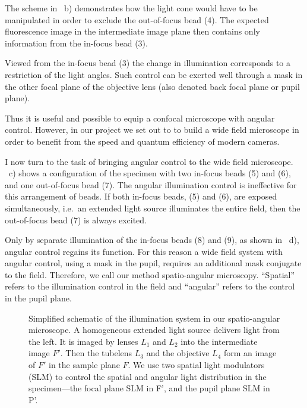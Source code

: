 The scheme in ~b) demonstrates how the light
cone would have to be manipulated in order to exclude the out-of-focus
bead (4). The expected fluorescence image in the intermediate image
plane then contains only information from the in-focus bead (3).

Viewed from the in-focus bead (3) the change in illumination
corresponds to a restriction of the light angles. Such control can be
exerted well through a mask in the other focal plane of the objective
lens (also denoted back focal plane or pupil plane).

Thus it is useful and possible to equip a confocal microscope with
angular control. However, in our project we set out to to build a wide
field microscope in order to benefit from the speed and quantum
efficiency of modern cameras.

I now turn to the task of bringing angular control to the wide field
microscope. ~c) shows a configuration of the
specimen with two in-focus beads (5) and (6), and one out-of-focus
bead (7).  The angular illumination control is ineffective for this
arrangement of beads.  If both in-focus beads, (5) and (6), are
exposed simultaneously, i.e.\ an extended light source illuminates the
entire field, then the out-of-focus bead (7) is always excited.

Only by separate illumination of the in-focus beads (8) and (9), as
shown in ~d), angular control regains its
function. For this reason a wide field system with angular control,
using a mask in the pupil, requires an additional mask conjugate to
the field.  Therefore, we call our method spatio-angular
microscopy. ``Spatial'' refers to the illumination control in the
field and ``angular'' refers to the control in the pupil plane.


\begin{figure}[!hbt] \centering {}
  \caption{Simplified schematic of the illumination system in our
spatio-angular microscope. A homogeneous extended light source
delivers light from the left. It is imaged by lenses $L_1$ and $L_2$
into the intermediate image $F'$. Then the tubelens $L_3$ and the
objective $L_4$ form an image of $F'$ in the sample plane $F$. We use
two spatial light modulators (SLM) to control the spatial and angular
light distribution in the specimen---the focal plane SLM in F', and
the pupil plane SLM in P'.}
  \label{fig:memi-simple}
\end{figure}

